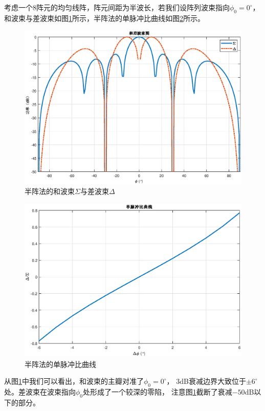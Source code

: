 \documentclass[master]{thesis-uestc}
\begin{document}
考虑一个$8$阵元的均匀线阵，阵元间距为半波长，若我们设阵列波束指向$\phi_0=0^\circ$，
和波束与差波束如图\ref{semi_sigma_delta}所示，半阵法的单脉冲比曲线如图\ref{semi_MRC_figure}所示。
\begin{figure}[h]
\includegraphics[scale=0.5]{pic/semi_sigma_delta.eps}
\caption{半阵法的和波束$\Sigma$与差波束$\Delta$}
\label{semi_sigma_delta}
\end{figure}

\begin{figure}[h]
\includegraphics[scale=0.5]{pic/semi_MRC.eps}
\caption{半阵法的单脉冲比曲线}
\label{semi_MRC_figure}
\end{figure}

从图\ref{semi_sigma_delta}中我们可以看出，和波束的主瓣对准了$\phi_0=0^\circ$，
$3$dB衰减边界大致位于$\pm6^\circ$处。差波束在波束指向$\phi_0$处形成了一个较深的零陷，
注意图\ref{semi_sigma_delta}截断了衰减$-50$dB以下的部分。
\end{document}
